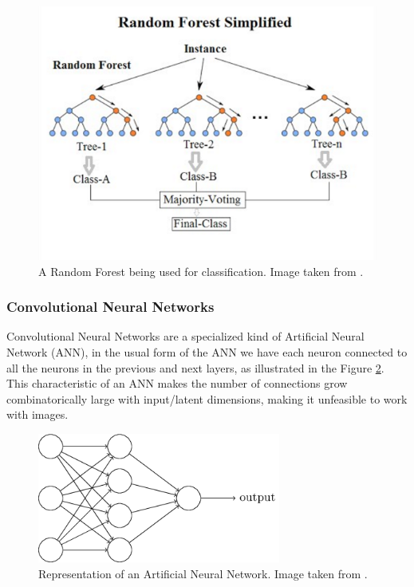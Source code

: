 \begin{figure}[H]
    \includegraphics[width=\textwidth]{Cap2-Methods/Random_forest_diagram_complete.png}
    \centering
	\caption{A Random Forest being used for classification. Image taken from \cite{randomimg}.}
	\label{random}
\end{figure}

\subsubsection{Convolutional Neural Networks}

Convolutional Neural Networks are a specialized kind of Artificial Neural Network (ANN), in the usual form of the ANN we have each neuron connected to all the neurons in the previous and next layers, as illustrated in the Figure \ref{ann}. This characteristic of an ANN makes the number of connections grow combinatorically large with input/latent dimensions, making it unfeasible to work with images.

\begin{figure}[H]
    \includegraphics[width=8cm]{Cap2-Methods/rede.png}
    \centering
	\caption{Representation of an Artificial Neural Network. Image taken from \cite{neuralimg}.}
	\label{ann}
\end{figure}

